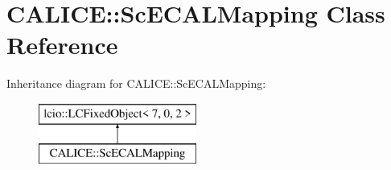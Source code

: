 \section{C\-A\-L\-I\-C\-E\-:\-:Sc\-E\-C\-A\-L\-Mapping Class Reference}
\label{classCALICE_1_1ScECALMapping}
Inheritance diagram for C\-A\-L\-I\-C\-E\-:\-:Sc\-E\-C\-A\-L\-Mapping\-:\begin{figure}[H]
\begin{center}
\leavevmode
\includegraphics[height=2.000000cm]{classCALICE_1_1ScECALMapping}
\end{center}
\end{figure}

